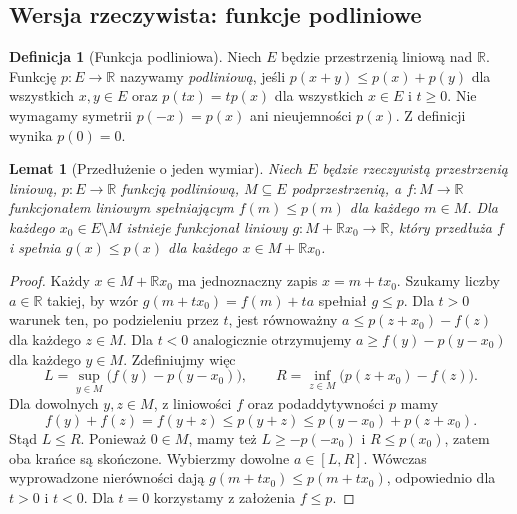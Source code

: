 \documentclass[11pt,a4paper]{article}
\numberwithin{equation}{section}
\theoremstyle{plain}
\newtheorem{lemat}[twierdzenie]{Lemat}
\theoremstyle{definition}
\newtheorem{definicja}[twierdzenie]{Definicja}
\theoremstyle{remark}
\newcommand{\R}{\mathbb R}
\begin{document}
\subsection{Wersja rzeczywista: funkcje podliniowe}

\begin{definicja}[Funkcja podliniowa]\label{def:sublinear}
Niech $E$ będzie przestrzenią liniową nad $\R$.
Funkcję $p:E\to\R$ nazywamy \emph{podliniową}, jeśli
$p(x+y)\le p(x)+p(y)$ dla wszystkich $x,y\in E$ oraz
$p(tx)=tp(x)$ dla wszystkich $x\in E$ i $t\ge0$.
Nie wymagamy symetrii $p(-x)=p(x)$ ani nieujemności $p(x)$.
Z definicji wynika $p(0)=0$.
\end{definicja}

\begin{lemat}[Przedłużenie o jeden wymiar]
\label{lem:hb-one-step}
Niech $E$ będzie rzeczywistą przestrzenią liniową,
$p:E\to\R$ funkcją podliniową, $M\subseteq E$ podprzestrzenią,
a $f:M\to\R$ funkcjonałem liniowym spełniającym
$f(m)\le p(m)$ dla każdego $m\in M$. Dla każdego
$x_0\in E\setminus M$ istnieje funkcjonał liniowy
$g:M+\R x_0\to\R$, który przedłuża $f$ i spełnia
$g(x)\le p(x)$ dla każdego $x\in M+\R x_0$.
\end{lemat}
\begin{proof}
Każdy $x\in M+\R x_0$ ma jednoznaczny zapis $x=m+tx_0$.
Szukamy liczby $a\in\R$ takiej, by wzór
$g(m+tx_0)=f(m)+ta$ spełniał $g\le p$.
Dla $t>0$ warunek ten, po podzieleniu przez $t$,
jest równoważny $a\le p(z+x_0)-f(z)$ dla każdego $z\in M$.
Dla $t<0$ analogicznie otrzymujemy
$a\ge f(y)-p(y-x_0)$ dla każdego $y\in M$.
Zdefiniujmy więc
\[
 L=\sup_{y\in M}\bigl(f(y)-p(y-x_0)\bigr),\qquad
 R=\inf_{z\in M}\bigl(p(z+x_0)-f(z)\bigr).
\]
Dla dowolnych $y,z\in M$, z liniowości $f$ oraz
podaddytywności $p$ mamy
\[
 f(y)+f(z)=f(y+z)\le p(y+z)
 \le p(y-x_0)+p(z+x_0).
\]
Stąd $L\le R$. Ponieważ $0\in M$, mamy też
$L\ge-p(-x_0)$ i $R\le p(x_0)$, zatem oba krańce
są skończone. Wybierzmy dowolne $a\in[L,R]$.
Wówczas wyprowadzone nierówności dają $g(m+tx_0)\le
p(m+tx_0)$, odpowiednio dla $t>0$ i $t<0$.
Dla $t=0$ korzystamy z założenia $f\le p$.
\end{proof}
\end{document}
